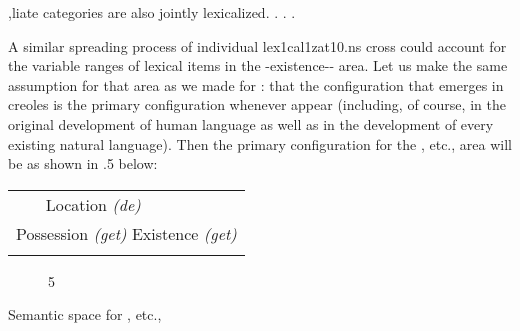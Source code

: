 ,liate categories are also jointly lexicalized. . . .

A similar spreading process of individual lex1cal1zat10.ns cross  could account for the variable ranges of lexical items 
in the -existence-- area. Let us make the same assumption for that area as we made for : that the con\-figuration that emerges in creoles is the primary configuration whenever  appear (including, of course, in the original development of human language as well as in the development of every existing natural language). Then the primary configuration for the , etc., area will be as shown in .5 below:

\begin{tabular}{ll}
\lsptoprule

\multicolumn{1}{l}{Ownership \textit{(a)}} & Location \textit{(}\textit{de)}\\
\multicolumn{2}{l}{Possession \textit{(get) }Existence \textit{(get)}}\\
\lspbottomrule
\end{tabular}
\begin{figure}
\caption{5}
\label{fig:4}
\end{figure}

Semantic space for , etc., 

